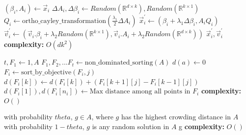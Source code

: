 \begin{algorithm}[H]
\caption{$\text{mutate}[\vec{\lambda}](\vec{x}_i,\vec{v}_i)$}
\label{mopso:mutate}
\begin{algorithmic}[1]
\State $(\beta_i, A_i)\gets \vec{x}_i$
\State $\Delta A_i, \Delta \beta_i \gets Random(\mathbb{R}^{d\times k}),Random(\mathbb{R}^{k\times 1})$
\State $Q_i \gets \text{ortho\_cayley\_transformation}(\frac{\lambda_1}{2} \Delta A_i)$
\State $\vec{x}^{'}_i\gets (\beta_i + \lambda_1 \Delta \beta_i, A_iQ_i)$
\State $\vec{v}^{'}_i \gets (\vec{v}_i.\beta_i + \lambda_2 Random(\mathbb{R}^{k\times 1}), \vec{v}_i.A_i + \lambda_2 Random(\mathbb{R}^{d\times k}))$
\State \Return $\vec{x}^{'}_i, \vec{v}^{'}_i$
\State \textbf{complexity: } $O(dk^2)$
\end{algorithmic}
\end{algorithm}

\begin{algorithm}[H]
\caption{$\text{crowding\_distance}[Case](A)$}
\label{mopso:crowding_distance}
\begin{algorithmic}[1]
 
\State $t,F_1 \gets 1, A$
\EndIf
{} 
\State $F_1,F_2,...F_t \gets \text{non\_dominated\_sorting}(A)$
\EndIf
{}
        \State $d(a) \gets 0$
    \EndFor
     
        \State $F_i \gets \text{sort\_by\_objective}(F_i,j)$ 
         
            \State $d(F_i[k]) \gets d(F_i[k]) + (F_i[k+1][j] - F_i[k-1][j])$
        \EndFor
        \State $d(F_i[1]), d(F_i[n_i])  \gets \text{Max distance among all points in } F_i $
    \EndFor
\EndFor
\State \textbf{complexity: } $O()$
\end{algorithmic}
\end{algorithm}

\begin{algorithm}[H]
\caption{$\text{get\_global\_best}[\theta](A)$}
\label{mopso:get_global_best}
\begin{algorithmic}[1]
\State with probability $theta$, $ g \in A$, where $g$ has the highest crowding distance in $A$
\State with probability $1-theta$, $ g $ is any random solution in $A$ 
\State \Return g
\State \textbf{complexity: } $O()$
\end{algorithmic}
\end{algorithm}

